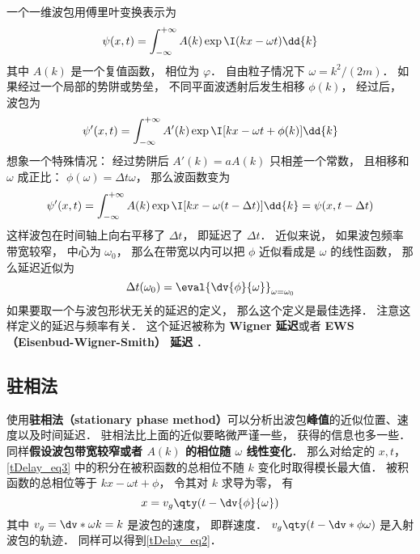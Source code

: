 
\begin{issues}
\issueDraft
\end{issues}

一个一维波包用傅里叶变换表示为
\begin{equation}\label{tDelay_eq3}
\psi(x, t) = \int_{-\infty}^{+\infty} A(k) \exp \I( kx - \omega t) \dd{k}
\end{equation}
其中 $A(k)$ 是一个复值函数， 相位为 $\varphi$． 自由粒子情况下 $\omega = k^2/(2m)$． 如果经过一个局部的势阱或势垒， 不同平面波透射后发生相移 $\phi(k)$， 经过后， 波包为
\begin{equation}\label{tDelay_eq1}
\psi'(x, t) = \int_{-\infty}^{+\infty} A'(k) \exp \I[kx - \omega t + \phi(k)] \dd{k}
\end{equation}
想象一个特殊情况： 经过势阱后 $A'(k) = a A(k)$ 只相差一个常数， 且相移和 $\omega$ 成正比： $\phi(\omega) = \Delta t \omega$， 那么波函数变为
\begin{equation}
\psi'(x, t) = \int_{-\infty}^{+\infty} A(k) \exp \I[kx - \omega (t - \Delta t) ] \dd{k}
= \psi(x, t - \Delta t)
\end{equation}
这样波包在时间轴上向右平移了 $\Delta t$， 即延迟了 $\Delta t$． 近似来说， 如果波包频率带宽较窄， 中心为 $\omega_0$， 那么在带宽以内可以把 $\phi$ 近似看成是 $\omega$ 的线性函数， 那么延迟近似为
\begin{equation}\label{tDelay_eq2}
\Delta t(\omega_0) = \eval{\dv{\phi}{\omega}}_{\omega = \omega_0}
\end{equation}
如果要取一个与波包形状无关的延迟的定义， 那么这个定义是最佳选择． 注意这样定义的延迟与频率有关． 这个延迟被称为 \textbf{Wigner 延迟}或者 \textbf{EWS （Eisenbud-Wigner-Smith） 延迟} ．

\subsection{驻相法}
使用\textbf{驻相法（stationary phase method）}可以分析出波包\textbf{峰值}的近似位置、速度以及时间延迟． 驻相法比上面的近似要略微严谨一些， 获得的信息也多一些． 同样\textbf{假设波包带宽较窄或者 $A(k)$ 的相位随 $\omega$ 线性变化}． 那么对给定的 $x, t$， \autoref{tDelay_eq3} 中的积分在被积函数的总相位不随 $k$ 变化时取得模长最大值． 被积函数的总相位等于 $kx - \omega t + \phi$， 令其对 $k$ 求导为零， 有
\begin{equation}
x = v_g \qty(t - \dv{\phi}{\omega})
\end{equation}
其中 $v_g = \dv*{\omega}{k} = k$ 是波包的速度， 即群速度． $v_g \qty(t - \dv*{\phi}{\omega})$ 是入射波包的轨迹． 同样可以得到\autoref{tDelay_eq2}．

